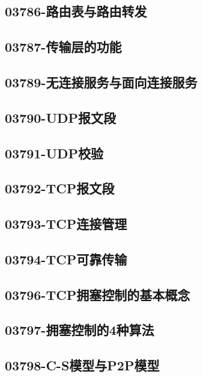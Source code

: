 \subsection{03786-路由表与路由转发}

\subsection{03787-传输层的功能}

\subsection{03789-无连接服务与面向连接服务}

\subsection{03790-UDP报文段}

\subsection{03791-UDP校验}

\subsection{03792-TCP报文段}

\subsection{03793-TCP连接管理}

\subsection{03794-TCP可靠传输}

\subsection{03796-TCP拥塞控制的基本概念}

\subsection{03797-拥塞控制的4种算法}

\subsection{03798-C-S模型与P2P模型}

